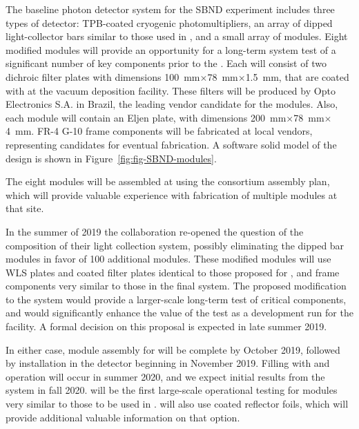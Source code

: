 The baseline photon detector system for the SBND experiment includes three types of detector:  TPB-coated cryogenic photomultipliers, an array of dipped light-collector bars similar to those used in , and a small array of  modules.  Eight modified  modules will provide an opportunity for a long-term system test of a significant number of key components prior to the   .  Each   will consist of two dichroic filter plates with dimensions \SI{100}{mm}$\times$\SI{78}{mm}$\times$\SI{1.5}{mm},
 that are coated with  at the  vacuum deposition facility.  These filters will be produced by Opto Electronics S.A. in Brazil, the leading vendor candidate for the   modules.  Also, each  module will contain an Eljen  plate, with dimensions 
\SI{200}{mm}$\times$\SI{78}{mm}$\times$\SI{4}{mm}. FR-4 G-10 frame components will be fabricated at local vendors, representing candidates for eventual  fabrication.  A software solid model of the design is shown in Figure~\ref{fig:fig-SBND-modules}.

The eight   modules will be assembled at  using the   consortium assembly plan,
which will provide valuable experience with fabrication of multiple modules at that site.

In the summer of 2019 the  collaboration re-opened the question of the composition of their light collection system, possibly eliminating the dipped bar modules in favor of \num{100} additional  modules.  These modified modules will use WLS plates and coated filter plates identical to those proposed for , and frame components very similar to those in the final   system.  The proposed modification to the  system would provide a larger-scale long-term test of critical  components, and would significantly enhance the value of the test as a development run for the  facility.
A formal decision on this proposal is expected in late summer 2019.

In either case, module assembly for  will be complete by October 2019, followed by installation in the detector beginning in November 2019.  Filling with  and operation will occur in summer 2020, and we expect initial results from the  system in fall 2020.   will be the first large-scale operational testing for  modules very similar to those to be used in .
 will also use coated reflector foils, which will provide additional valuable information on that   option.  

